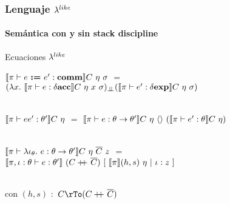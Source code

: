 \documentclass{beamer}
\begin{document}
\begin{frame}

\frametitle{Lenguaje $\lambda^{like}$}
\framesubtitle{Semántica con y sin stack discipline}

\begin{block}{Ecuaciones $\lambda^{like}$}

$\llbracket  \pi \vdash e \ \textbf{:=} \ e' : \textbf{comm}  \rrbracket C \ \eta \ \sigma$ 
$=$ \\
\quad \quad \quad \quad \quad 
$(\lambda x . \ \llbracket \pi \vdash e : \delta \textbf{acc} \rrbracket C \ \eta \ x \ \sigma)_{\bot \!\!\! \bot}
(\llbracket  \pi \vdash e' : \delta \textbf{exp}  \rrbracket C \ \eta \ \sigma)$\\

\

$\semBrcks{ \pi \vdash ee' : \theta' }C \ \eta$ 
$=$ 
$\llbracket  \pi \vdash e : \theta \rightarrow \theta'  \rrbracket C \ \eta \ \langle  \rangle \
(\llbracket  \pi \vdash e' : \theta  \rrbracket C \ \eta)$\\

\

$\semBrcks{ \pi \vdash \lambda \iota_{\theta} . \ e : \theta \rightarrow \theta' }C \ \eta \ 
\overline{C} \ z$ 
$=$ \\
\quad \quad \quad \quad \quad \quad 
$\llbracket  \pi,\iota:\theta \vdash e : \theta'  \rrbracket \ (C +\kern-1.3ex+\kern0.8ex \overline{C}) \
[ \ \llbracket \pi \rrbracket(h,s) \ \eta \ | \ \iota:z \ ]$\\

\

con $(h,s)$ $:$ $C \rTo (C \concat \overline{C})$ 

\end{block}

\end{frame}
\end{document}
